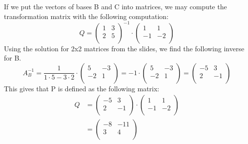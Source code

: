 \documentclass[a4paper]{article}
\begin{document}
\begin{enumerate}
If we put the vectors of bases B and C into matrices, we may compute the transformation matrix with the following computation:
\[
Q =
\left(
\begin{array}{cc}
1 & 3 \\
2 & 5 \\
\end{array}
\right)^{-1}
\cdot
\left(
\begin{array}{cc}
1 & 1 \\
-1 & -2 \\
\end{array}
\right)
\]
Using the solution for 2x2 matrices from the slides, we find the following inverse for B.
\[
A_B^{-1} =
\frac{1}{1 \cdot 5 - 3 \cdot 2} \cdot
\left(
\begin{array}{cc}
5 & -3 \\
-2 & 1 \\
\end{array}
\right)
=
-1 \cdot
\left(
\begin{array}{cc}
5 & -3 \\
-2 & 1 \\
\end{array}
\right)
=
\left(
\begin{array}{cc}
-5 & 3 \\
2 & -1 \\
\end{array}
\right)
\]
This gives that P is defined as the following matrix:
\begin{align*}
Q &=
\left(
\begin{array}{cc}
-5 & 3 \\
2 & -1 \\
\end{array}
\right)
\cdot
\left(
\begin{array}{cc}
1 & 1 \\
-1 & -2 \\
\end{array}
\right) \\
&=
\left(
\begin{array}{cc}
-8 & -11 \\
3 & 4 \\
\end{array}
\right)
\end{align*}


\end{enumerate}
\end{document}
